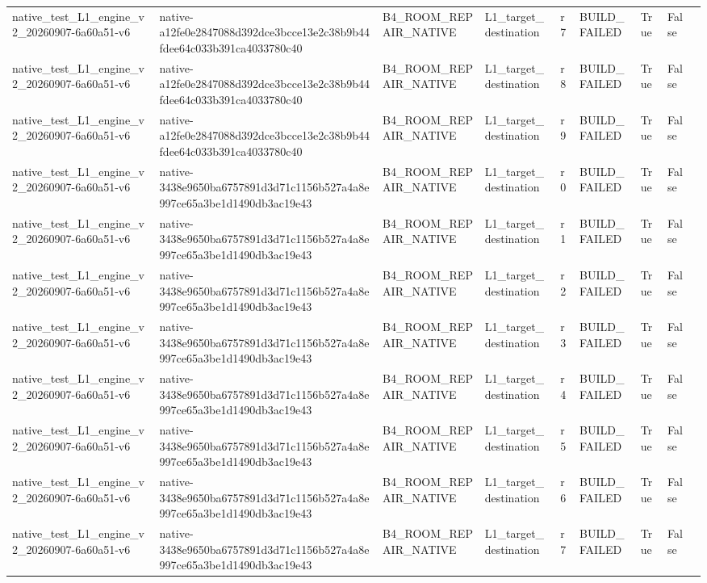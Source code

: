 \begin{tabular}{lllllllll}
native\_test\_L1\_engine\_v2\_20260907-6a60a51-v6 & native-a12fe0e2847088d392dce3bcce13e2c38b9b44fdee64c033b391ca4033780c40 & B4\_ROOM\_REPAIR\_NATIVE & L1\_target\_destination & r7 & BUILD\_FAILED & True & False &  \\
native\_test\_L1\_engine\_v2\_20260907-6a60a51-v6 & native-a12fe0e2847088d392dce3bcce13e2c38b9b44fdee64c033b391ca4033780c40 & B4\_ROOM\_REPAIR\_NATIVE & L1\_target\_destination & r8 & BUILD\_FAILED & True & False &  \\
native\_test\_L1\_engine\_v2\_20260907-6a60a51-v6 & native-a12fe0e2847088d392dce3bcce13e2c38b9b44fdee64c033b391ca4033780c40 & B4\_ROOM\_REPAIR\_NATIVE & L1\_target\_destination & r9 & BUILD\_FAILED & True & False &  \\
native\_test\_L1\_engine\_v2\_20260907-6a60a51-v6 & native-3438e9650ba6757891d3d71c1156b527a4a8e997ce65a3be1d1490db3ac19e43 & B4\_ROOM\_REPAIR\_NATIVE & L1\_target\_destination & r0 & BUILD\_FAILED & True & False &  \\
native\_test\_L1\_engine\_v2\_20260907-6a60a51-v6 & native-3438e9650ba6757891d3d71c1156b527a4a8e997ce65a3be1d1490db3ac19e43 & B4\_ROOM\_REPAIR\_NATIVE & L1\_target\_destination & r1 & BUILD\_FAILED & True & False &  \\
native\_test\_L1\_engine\_v2\_20260907-6a60a51-v6 & native-3438e9650ba6757891d3d71c1156b527a4a8e997ce65a3be1d1490db3ac19e43 & B4\_ROOM\_REPAIR\_NATIVE & L1\_target\_destination & r2 & BUILD\_FAILED & True & False &  \\
native\_test\_L1\_engine\_v2\_20260907-6a60a51-v6 & native-3438e9650ba6757891d3d71c1156b527a4a8e997ce65a3be1d1490db3ac19e43 & B4\_ROOM\_REPAIR\_NATIVE & L1\_target\_destination & r3 & BUILD\_FAILED & True & False &  \\
native\_test\_L1\_engine\_v2\_20260907-6a60a51-v6 & native-3438e9650ba6757891d3d71c1156b527a4a8e997ce65a3be1d1490db3ac19e43 & B4\_ROOM\_REPAIR\_NATIVE & L1\_target\_destination & r4 & BUILD\_FAILED & True & False &  \\
native\_test\_L1\_engine\_v2\_20260907-6a60a51-v6 & native-3438e9650ba6757891d3d71c1156b527a4a8e997ce65a3be1d1490db3ac19e43 & B4\_ROOM\_REPAIR\_NATIVE & L1\_target\_destination & r5 & BUILD\_FAILED & True & False &  \\
native\_test\_L1\_engine\_v2\_20260907-6a60a51-v6 & native-3438e9650ba6757891d3d71c1156b527a4a8e997ce65a3be1d1490db3ac19e43 & B4\_ROOM\_REPAIR\_NATIVE & L1\_target\_destination & r6 & BUILD\_FAILED & True & False &  \\
native\_test\_L1\_engine\_v2\_20260907-6a60a51-v6 & native-3438e9650ba6757891d3d71c1156b527a4a8e997ce65a3be1d1490db3ac19e43 & B4\_ROOM\_REPAIR\_NATIVE & L1\_target\_destination & r7 & BUILD\_FAILED & True & False &  \\

\end{tabular}
